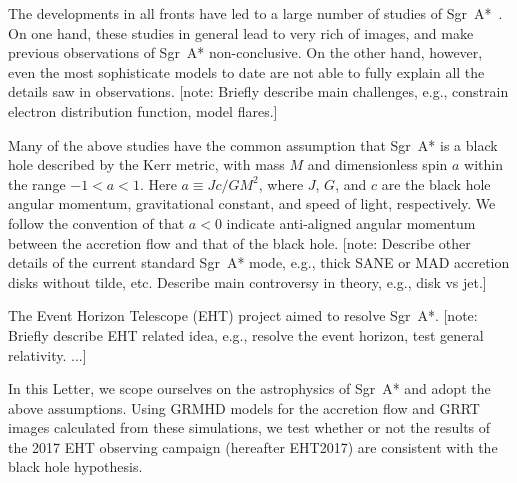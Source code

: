 \documentclass[twocolumn,tighten,dvipsnames]{aastex63}
\newcommand\sgra{Sgr~A*\xspace}
\newcommand\mbh{{M}} %
\newcommand\abh{{a}} %
\newcommand\<{{\langle}}
\renewcommand\>{{\rangle}} %
\newcommand\note[1]{{\color{OliveGreen}[note: #1]}}
\begin{document}
The developments in all fronts have led to a large number of studies
of \sgra~\citep[e.g.,][]{2006MNRAS.370..219M, 2007MNRAS.379.1519M,
  2009A&A...508L..13M, 2009ApJ...698..676D, 2009ApJ...701..521C,
  2012MNRAS.421.1315Z, 2013A&A...559L...3M, 2014A&A...570A...7M,
  2014ApJ...790....1B, 2015A&A...576A..41B, 2015ApJ...799....1C,
  2015ApJ...802...69B, 2015ApJ...812..103C, 2015Sci...350.1242J,
  2016A&A...588A..57F, 2016ApJ...817..173L, 2016ApJ...824...40O,
  2016ApJ...826...77B, 2016ApJ...831....4P, 2016MNRAS.455.2187M,
  2017ApJ...837..180G, 2017ApJ...844...35M, 2017ApJ...851..148M,
  2017MNRAS.467.3604R, 2018A&A...612A..34D, 2018ApJ...856..163M,
  2018ApJ...859...60L, 2018ApJ...863..148P, 2018ApJ...865..104J,
  2018ApJ...868..101B, 2018JCAP...07..015H, 2018MNRAS.478.1875J,
  2018MNRAS.478.5209C, 2019ApJ...881L...2B, 2019ApJ...884..148B,
  2019ApJ...886...96H, 2020ApJ...896L...6R, 2020ApJ...897...99T,
  2020MNRAS.492.3272R, 2020MNRAS.493.1404A, 2020MNRAS.494.4168D,
  2020MNRAS.494.5923P, 2020arXiv200514251B, 2020arXiv200603657D,
  2020arXiv200603658P}.
On one hand, these studies in general lead to very rich of images, and
make previous observations of \sgra non-conclusive.
On the other hand, however, even the most sophisticate models to date
are not able to fully explain all the details saw in observations.
\note{Briefly describe main challenges, e.g., constrain electron
  distribution function, model flares.}

Many of the above studies have the common assumption that \sgra is a
black hole described by the Kerr metric, with mass $\mbh$ and
dimensionless spin $\abh$ within the range $-1 < \abh < 1$.
Here $\abh \equiv Jc/G\mbh^2$, where $J$, $G$, and $c$ are the black
hole angular momentum, gravitational constant, and speed of light,
respectively.
We follow the convention of  that
$\abh < 0$ indicate anti-aligned angular momentum between the
accretion flow and that of the black hole.
\note{Describe other details of the current standard \sgra mode, e.g.,
  thick SANE or MAD accretion disks without tilde, etc.
  Describe main controversy in theory, e.g., disk vs jet.}

The Event Horizon Telescope (EHT) project aimed to resolve \sgra.
\note{Briefly describe EHT related idea, e.g., resolve the event
  horizon, test general relativity.
  ...}

In this Letter, we scope ourselves on the astrophysics of \sgra and
adopt the above assumptions.
Using GRMHD models for the accretion flow and GRRT images calculated
from these simulations, we test whether or not the results of the 2017
EHT observing campaign (hereafter EHT2017) are consistent with the
black hole hypothesis.
\end{document}
